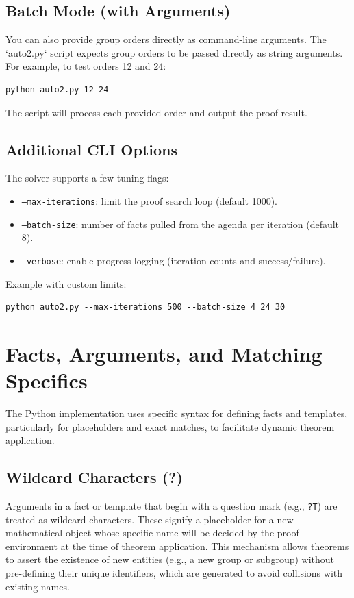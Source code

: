 \documentclass[11pt,oneside]{article}
\begin{document}
\subsection{Batch Mode (with Arguments)}
You can also provide group orders directly as command-line arguments. The `auto2.py` script expects group orders to be passed directly as string arguments. For example, to test orders 12 and 24:
\begin{verbatim}
python auto2.py 12 24
\end{verbatim}
The script will process each provided order and output the proof result.

\subsection{Additional CLI Options}
The solver supports a few tuning flags:
\begin{itemize}
\item \texttt{--max-iterations}: limit the proof search loop (default 1000).
\item \texttt{--batch-size}: number of facts pulled from the agenda per iteration (default 8).
\item \texttt{--verbose}: enable progress logging (iteration counts and success/failure).
\end{itemize}
Example with custom limits:
\begin{verbatim}
python auto2.py --max-iterations 500 --batch-size 4 24 30
\end{verbatim}

\section{Facts, Arguments, and Matching Specifics}
The Python implementation uses specific syntax for defining facts and templates, particularly for placeholders and exact matches, to facilitate dynamic theorem application.

\subsection{Wildcard Characters (?)}
Arguments in a fact or template that begin with a question mark (e.g., \texttt{?T}) are treated as wildcard characters. These signify a placeholder for a new mathematical object whose specific name will be decided by the proof environment at the time of theorem application. This mechanism allows theorems to assert the existence of new entities (e.g., a new group or subgroup) without pre-defining their unique identifiers, which are generated to avoid collisions with existing names.
\end{document}
